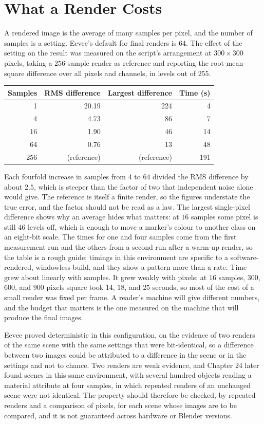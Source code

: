 \section{What a Render Costs}

A rendered image is the average of many samples per pixel, and the number of samples is a setting. Eevee's default for final renders is $64$. The effect of the setting on the result was measured on the script's arrangement at $300\times300$ pixels, taking a $256$-sample render as reference and reporting the root-mean-square difference over all pixels and channels, in levels out of $255$.

\begin{center}
\begin{tabular}{rrrr}
\toprule
Samples & RMS difference & Largest difference & Time (s)\\
\midrule
1 & 20.19 & 224 & 4\\
4 & 4.73 & 86 & 7\\
16 & 1.90 & 46 & 14\\
64 & 0.76 & 13 & 48\\
256 & (reference) & (reference) & 191\\
\bottomrule
\end{tabular}
\end{center}

Each fourfold increase in samples from $4$ to $64$ divided the RMS difference by about $2.5$, which is steeper than the factor of two that independent noise alone would give. The reference is itself a finite render, so the figures understate the true error, and the factor should not be read as a law. The largest single-pixel difference shows why an average hides what matters: at $16$ samples some pixel is still $46$ levels off, which is enough to move a marker's colour to another class on an eight-bit scale. The times for one and four samples come from the first measurement run and the others from a second run after a warm-up render, so the table is a rough guide; timings in this environment are specific to a software-rendered, windowless build, and they show a pattern more than a rate. Time grew about linearly with samples. It grew weakly with pixels: at $16$ samples, $300$, $600$, and $900$ pixels square took $14$, $18$, and $25$ seconds, so most of the cost of a small render was fixed per frame. A reader's machine will give different numbers, and the budget that matters is the one measured on the machine that will produce the final images.

Eevee proved deterministic in this configuration, on the evidence of two renders of the same scene with the same settings that were bit-identical, so a difference between two images could be attributed to a difference in the scene or in the settings and not to chance. Two renders are weak evidence, and Chapter 24 later found scenes in this same environment, with several hundred objects reading a material attribute at four samples, in which repeated renders of an unchanged scene were not identical. The property should therefore be checked, by repeated renders and a comparison of pixels, for each scene whose images are to be compared, and it is not guaranteed across hardware or Blender versions.

